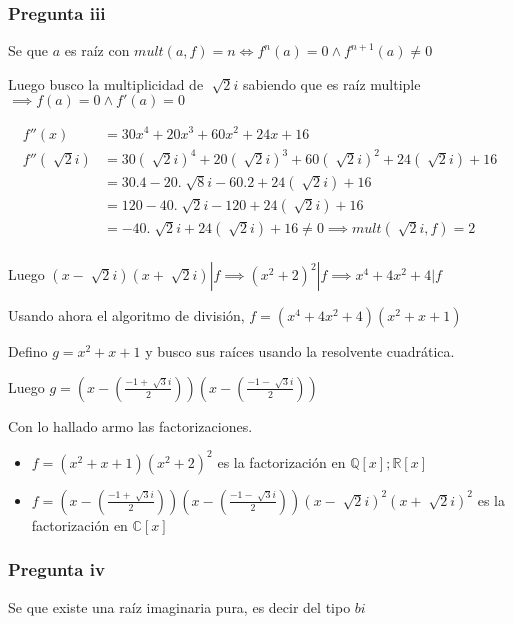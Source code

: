 \subsubsection{Pregunta iii}

Se que $ a $ es raíz con $ mult(a, f) = n \iff f^n(a) = 0 \wedge f^{n+1}(a) \neq 0 $

Luego busco la multiplicidad de $ \sqrt[]{2}i $ sabiendo que es raíz multiple $ \implies f(a) = 0 \wedge f'(a) = 0 $

\begin{align*}
    f''(x) &= 30x^4 + 20x^3 + 60x^2 + 24x + 16 \\
    f''(\sqrt[]{2}i) &= 30(\sqrt[]{2}i)^4 + 20(\sqrt[]{2}i)^3 + 60(\sqrt[]{2}i)^2 + 24(\sqrt[]{2}i) + 16 \\
    &= 30.4 - 20.\sqrt[]{8}i - 60.2 + 24(\sqrt[]{2}i) + 16 \\
    &= 120 - 40.\sqrt[]{2}i - 120 + 24(\sqrt[]{2}i) + 16 \\
    &= - 40.\sqrt[]{2}i + 24(\sqrt[]{2}i) + 16 \neq 0 \implies mult(\sqrt[]{2}i, f) = 2 \\
\end{align*}

Luego $ (x-\sqrt[]{2}i)(x+\sqrt[]{2}i) | f \implies (x^2+2)^2 | f \implies x^4 + 4x^2 + 4 |f $

Usando ahora el algoritmo de división, $ f = (x^4 + 4x^2 + 4)(x^2+x+1) $

Defino $ g = x^2+x+1 $ y busco sus raíces usando la resolvente cuadrática.

Luego $ g = (x-(\frac{-1+\sqrt[]{3}i}{2}))(x-(\frac{-1-\sqrt[]{3}i}{2})) $

Con lo hallado armo las factorizaciones.

\begin{itemize}
    \item $ f = (x^2+x+1)(x^2+2)^2 $ es la factorización en $ \mathbb{Q}[x]; \mathbb{R}[x] $
    \item $ f = (x-(\frac{-1+\sqrt[]{3}i}{2}))(x-(\frac{-1-\sqrt[]{3}i}{2}))(x-\sqrt[]{2}i)^2(x+\sqrt[]{2}i)^2 $ es la factorización en $ \mathbb{C}[x] $
\end{itemize}

\subsubsection{Pregunta iv}

Se que existe una raíz imaginaria pura, es decir del tipo $ bi $

